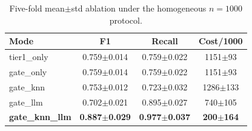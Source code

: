 \begin{table}[!t]
\centering
\caption{Five-fold mean$\pm$std ablation under the homogeneous $n{=}1000$ protocol.}
\label{tab:ablationmean}
\begin{tabular}{lccc}
\toprule
Mode & F1 & Recall & Cost/1000 \\
\midrule
tier1\_only & 0.759$\pm$0.014 & 0.759$\pm$0.022 & 1151$\pm$93 \\
gate\_only & 0.759$\pm$0.014 & 0.759$\pm$0.022 & 1151$\pm$93 \\
gate\_knn & 0.753$\pm$0.012 & 0.723$\pm$0.032 & 1286$\pm$133 \\
gate\_llm & 0.702$\pm$0.021 & 0.895$\pm$0.027 & 740$\pm$105 \\
\textbf{gate\_knn\_llm} & \textbf{0.887$\pm$0.029} & \textbf{0.977$\pm$0.037} & \textbf{200$\pm$164} \\
\bottomrule
\end{tabular}
\end{table}
